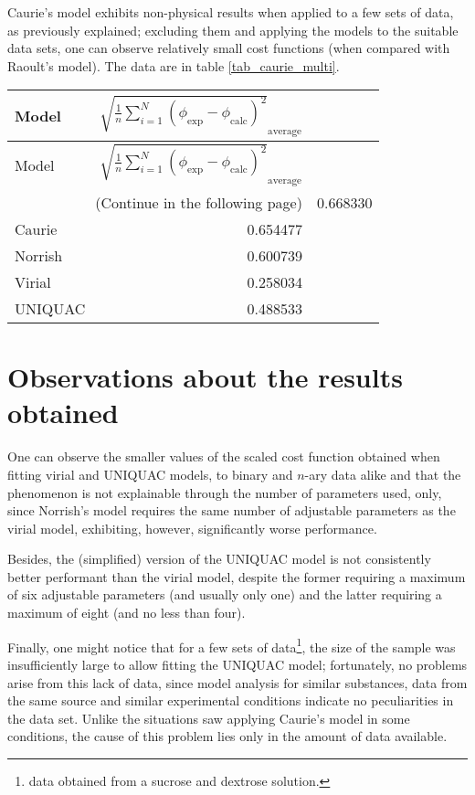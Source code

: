 Caurie's model exhibits non-physical results when applied to a few sets of data, as
previously explained; excluding them and applying the models to the suitable data
sets, one can observe relatively small cost functions (when compared with Raoult's
model). The data are in table \ref{tab_caurie_multi}.

\begin{tabularx}{\textwidth}{ X  r }
	\caption{Comparison with Caurie's model}
	\label{tab_caurie_multi}\\
	\toprule
	Model & %
		$\sqrt{\frac{1}{n}\sum_{i=1}^N(\phi_{\text{exp}}-%
		\phi_{\text{calc}})^2}_\text{average}$\\
	\midrule
	\endfirsthead
	\toprule
	Model & %
		$\sqrt{\frac{1}{n}\sum_{i=1}^N(\phi_{\text{exp}}-%
		\phi_{\text{calc}})^2}_\text{average}$\\\hline
	\midrule
	\endhead
	\midrule
	\multicolumn{2}{r}{\footnotesize(Continue in the following page)}
	\endfoot
	\endlastfoot
	Raoult & 0.668330 \\
	Caurie & 0.654477 \\
	Norrish & 0.600739 \\
	Virial & 0.258034 \\
	UNIQUAC & 0.488533 \\\hline
\end{tabularx}

\section{Observations about the results obtained}

One can observe the smaller values of the scaled cost function obtained when
fitting virial and UNIQUAC models, to binary and $n$-ary data alike and that the
phenomenon is not explainable through the number of parameters used, only,
since Norrish's model requires the same number of adjustable parameters as the
virial model, exhibiting, however, significantly worse performance.

Besides, the (simplified) version of the UNIQUAC model is not consistently better
performant than the virial model, despite the former requiring a maximum of
six adjustable parameters (and usually only one) and the latter requiring a maximum
of eight (and no less than four).

Finally, one might notice that for a few sets of data\footnote{%
	\cite{norrish1966} data obtained from a sucrose and dextrose solution.
}, the size of the sample was insufficiently large to allow fitting the UNIQUAC
model; fortunately, no problems arise from this lack of data, since model analysis
for similar substances, data from the same source and similar experimental conditions
indicate no peculiarities in the data set. Unlike the situations saw applying
Caurie's model in some conditions, the cause of this problem lies only in the
amount of data available.

